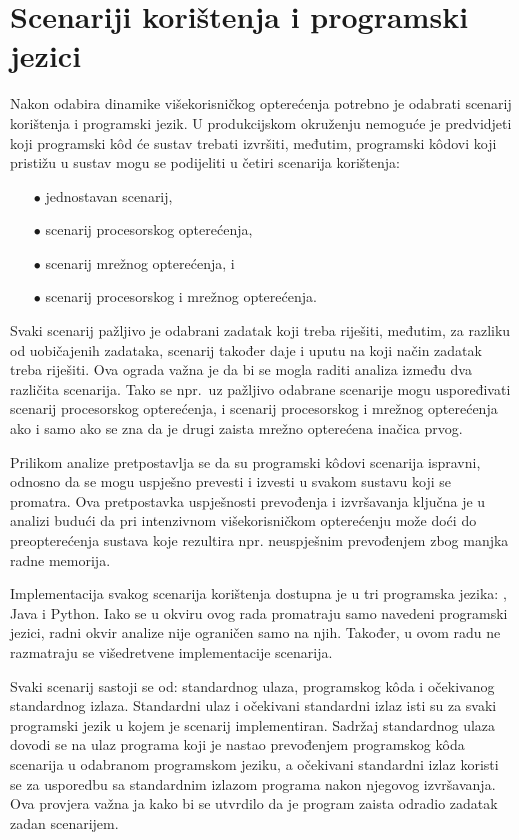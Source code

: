 \documentclass[times, utf8, diplomski]{fer}
\begin{document}
\pagebreak

\section{Scenariji korištenja i programski jezici}
Nakon odabira dinamike višekorisničkog opterećenja potrebno je odabrati scenarij korištenja i programski jezik. U produkcijskom okruženju nemoguće je predvidjeti koji programski kôd će sustav trebati izvršiti, međutim, programski kôdovi koji pristižu u sustav mogu se podijeliti u četiri scenarija korištenja:
\begin{itemize}
    \item[$\bullet$] jednostavan scenarij,
    \item[$\bullet$] scenarij procesorskog opterećenja,
    \item[$\bullet$] scenarij mrežnog opterećenja, i
    \item[$\bullet$] scenarij procesorskog i mrežnog opterećenja.
\end{itemize}

Svaki scenarij pažljivo je odabrani zadatak koji treba riješiti, međutim, za razliku od uobičajenih zadataka, scenarij također daje i uputu na koji način zadatak treba riješiti. Ova ograda važna je da bi se mogla raditi analiza između dva različita scenarija. Tako se npr.\ uz pažljivo odabrane scenarije mogu uspoređivati scenarij procesorskog opterećenja, i scenarij procesorskog i mrežnog opterećenja ako i samo ako se zna da je drugi zaista mrežno opterećena inačica prvog.

Prilikom analize pretpostavlja se da su programski kôdovi scenarija ispravni, odnosno da se mogu uspješno prevesti i izvesti u svakom sustavu koji se promatra. Ova pretpostavka uspješnosti prevođenja i izvršavanja ključna je u analizi budući da pri intenzivnom višekorisničkom opterećenju može doći do preopterećenja sustava koje rezultira npr. neuspješnim prevođenjem zbog manjka radne memorija.

Implementacija svakog scenarija korištenja dostupna je u tri programska jezika: , Java i Python. Iako se u okviru ovog rada promatraju samo navedeni programski jezici, radni okvir analize nije ograničen samo na njih. Također, u ovom radu ne razmatraju se višedretvene implementacije scenarija.

Svaki scenarij sastoji se od: standardnog ulaza, programskog kôda i očekivanog standardnog izlaza. Standardni ulaz i očekivani standardni izlaz isti su za svaki programski jezik u kojem je scenarij implementiran. Sadržaj standardnog ulaza dovodi se na ulaz programa koji je nastao prevođenjem programskog kôda scenarija u odabranom programskom jeziku, a očekivani standardni izlaz koristi se za usporedbu sa standardnim izlazom programa nakon njegovog izvršavanja. Ova provjera važna ja kako bi se utvrdilo da je program zaista odradio zadatak zadan scenarijem.
\end{document}
